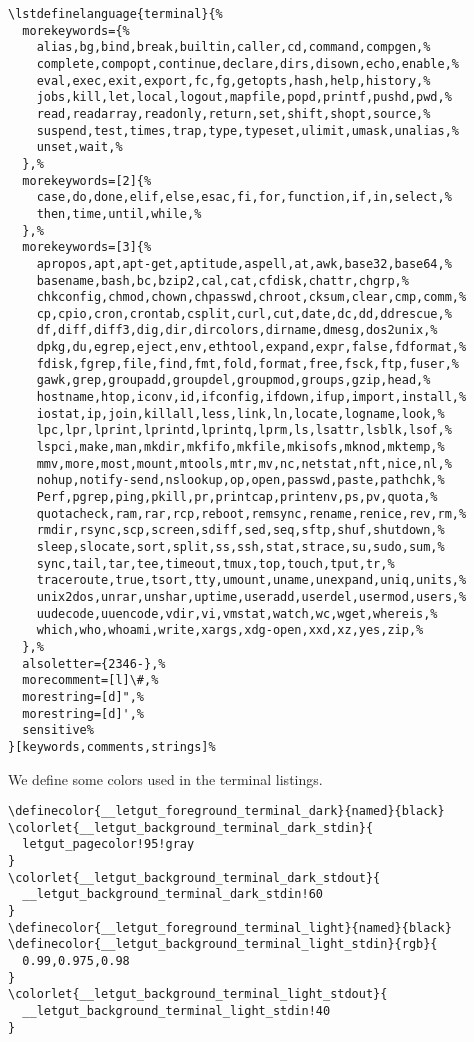 \documentclass{letgut}
\begin{document}
\begin{lstlisting}
\lstdefinelanguage{terminal}{%
  morekeywords={%
    alias,bg,bind,break,builtin,caller,cd,command,compgen,%
    complete,compopt,continue,declare,dirs,disown,echo,enable,%
    eval,exec,exit,export,fc,fg,getopts,hash,help,history,%
    jobs,kill,let,local,logout,mapfile,popd,printf,pushd,pwd,%
    read,readarray,readonly,return,set,shift,shopt,source,%
    suspend,test,times,trap,type,typeset,ulimit,umask,unalias,%
    unset,wait,%
  },%
  morekeywords=[2]{%
    case,do,done,elif,else,esac,fi,for,function,if,in,select,%
    then,time,until,while,%
  },%
  morekeywords=[3]{%
    apropos,apt,apt-get,aptitude,aspell,at,awk,base32,base64,%
    basename,bash,bc,bzip2,cal,cat,cfdisk,chattr,chgrp,%
    chkconfig,chmod,chown,chpasswd,chroot,cksum,clear,cmp,comm,%
    cp,cpio,cron,crontab,csplit,curl,cut,date,dc,dd,ddrescue,%
    df,diff,diff3,dig,dir,dircolors,dirname,dmesg,dos2unix,%
    dpkg,du,egrep,eject,env,ethtool,expand,expr,false,fdformat,%
    fdisk,fgrep,file,find,fmt,fold,format,free,fsck,ftp,fuser,%
    gawk,grep,groupadd,groupdel,groupmod,groups,gzip,head,%
    hostname,htop,iconv,id,ifconfig,ifdown,ifup,import,install,%
    iostat,ip,join,killall,less,link,ln,locate,logname,look,%
    lpc,lpr,lprint,lprintd,lprintq,lprm,ls,lsattr,lsblk,lsof,%
    lspci,make,man,mkdir,mkfifo,mkfile,mkisofs,mknod,mktemp,%
    mmv,more,most,mount,mtools,mtr,mv,nc,netstat,nft,nice,nl,%
    nohup,notify-send,nslookup,op,open,passwd,paste,pathchk,%
    Perf,pgrep,ping,pkill,pr,printcap,printenv,ps,pv,quota,%
    quotacheck,ram,rar,rcp,reboot,remsync,rename,renice,rev,rm,%
    rmdir,rsync,scp,screen,sdiff,sed,seq,sftp,shuf,shutdown,%
    sleep,slocate,sort,split,ss,ssh,stat,strace,su,sudo,sum,%
    sync,tail,tar,tee,timeout,tmux,top,touch,tput,tr,%
    traceroute,true,tsort,tty,umount,uname,unexpand,uniq,units,%
    unix2dos,unrar,unshar,uptime,useradd,userdel,usermod,users,%
    uudecode,uuencode,vdir,vi,vmstat,watch,wc,wget,whereis,%
    which,who,whoami,write,xargs,xdg-open,xxd,xz,yes,zip,%
  },%
  alsoletter={2346-},%
  morecomment=[l]\#,%
  morestring=[d]",%
  morestring=[d]',%
  sensitive%
}[keywords,comments,strings]%
\end{lstlisting}

We define some colors used in the terminal listings.

\begin{lstlisting}
\definecolor{__letgut_foreground_terminal_dark}{named}{black}
\colorlet{__letgut_background_terminal_dark_stdin}{
  letgut_pagecolor!95!gray
}
\colorlet{__letgut_background_terminal_dark_stdout}{
  __letgut_background_terminal_dark_stdin!60
}
\definecolor{__letgut_foreground_terminal_light}{named}{black}
\definecolor{__letgut_background_terminal_light_stdin}{rgb}{
  0.99,0.975,0.98
}
\colorlet{__letgut_background_terminal_light_stdout}{
  __letgut_background_terminal_light_stdin!40
}
\end{lstlisting}
\end{document}
